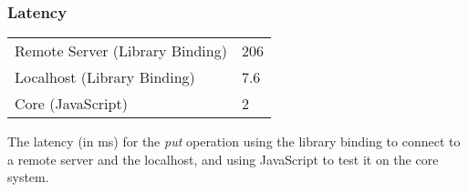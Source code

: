 \begin{frame}[fragile]
\frametitle{Latency}
\begin{table}
  \begin{tabular}{l | l}
    Remote Server (Library Binding) & 206 \\
    Localhost (Library Binding) & 7.6 \\
    Core (JavaScript) & 2
  \end{tabular}
  \label{table:latency}
\end{table}
The latency (in ms) for the \emph{put} operation using the library binding to connect to a remote server and the localhost, and using JavaScript to test it on the core system.
\end{frame}